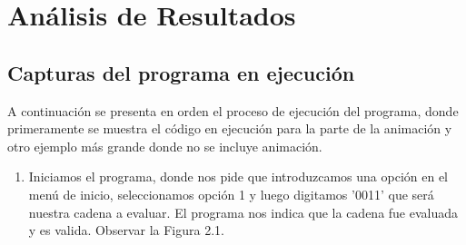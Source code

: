 \chapter{Análisis de Resultados}
\section{Capturas del programa en ejecución}

A continuación se presenta en orden el proceso de ejecución del programa, donde primeramente se muestra el código en ejecución para la parte de la animación y otro ejemplo más grande donde no se incluye animación.\newline
\newpage

\begin{enumerate}
\item Iniciamos el programa, donde nos pide que introduzcamos una opción en el menú de inicio, seleccionamos opción 1 y luego digitamos '0011' que será nuestra cadena a evaluar. El programa nos indica que la cadena fue evaluada y es valida. Observar la Figura 2.1.


\end{enumerate}
